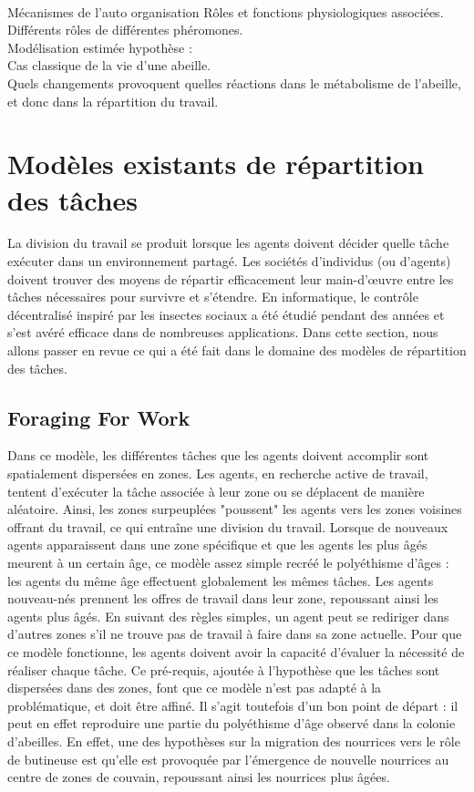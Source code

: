 		\paragraph{}
		Mécanismes de l'auto organisation
			Rôles et fonctions physiologiques associées.\\
			Différents rôles de différentes phéromones.\\
			Modélisation estimée hypothèse : \\
			Cas classique de la vie d'une abeille.\\
			Quels changements provoquent quelles réactions dans le métabolisme de l'abeille, et donc dans la répartition du travail.
			
			
			
	\section{Modèles existants de répartition des tâches}
	La division du travail se produit lorsque les agents doivent décider quelle tâche exécuter dans un environnement partagé. Les sociétés d'individus (ou d'agents) doivent trouver des moyens de répartir efficacement leur main-d'œuvre entre les tâches nécessaires pour survivre et s'étendre. En informatique, le contrôle décentralisé inspiré par les insectes sociaux a été étudié pendant des années et s'est avéré efficace dans de nombreuses applications. Dans cette section, nous allons passer en revue ce qui a été fait dans le domaine des modèles de répartition des tâches.
	
	
		\subsection{Foraging For Work  \cite{franks_foraging_1994}}
        Dans ce modèle, les différentes tâches que les agents doivent accomplir sont spatialement dispersées en zones. Les agents, en recherche active de travail, tentent d'exécuter la tâche associée à leur zone ou se déplacent de manière aléatoire. Ainsi, les zones surpeuplées "poussent" les agents vers les zones voisines offrant du travail, ce qui entraîne une division du travail. Lorsque de nouveaux agents apparaissent dans une zone spécifique et que les agents les plus âgés meurent à un certain âge, ce modèle assez simple recréé le polyéthisme d'âges : les agents du même âge effectuent globalement les mêmes tâches. Les agents nouveau-nés prennent les offres de travail dans leur zone, repoussant ainsi les agents plus âgés. En suivant des règles simples, un agent peut se rediriger dans d'autres zones s'il ne trouve pas de travail à faire dans sa zone actuelle. Pour que ce modèle fonctionne, les agents doivent avoir la capacité d'évaluer la nécessité de réaliser chaque tâche. Ce pré-requis,  ajoutée à l'hypothèse que les tâches sont dispersées dans des zones, font que ce modèle n'est pas adapté à la problématique, et doit être affiné. Il s'agit toutefois d'un bon point de départ : il peut en effet reproduire une partie du polyéthisme d'âge observé dans la colonie d'abeilles. En effet, une des hypothèses sur la migration des nourrices vers le rôle de butineuse est qu'elle est provoquée par l'émergence de nouvelle nourrices au centre de zones de couvain, repoussant ainsi les nourrices plus âgées.
        
